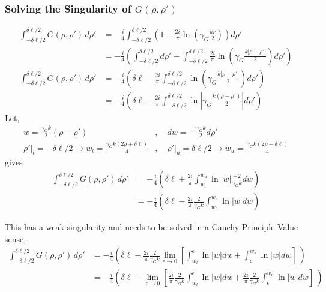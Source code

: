 \documentclass{article}
\newcommand{\0}{\varnothing}
\begin{document}
\subsubsection{Solving the Singularity of $G(\rho, \rho')$}
\begin{align*}
    \int_{-\delta\ell/2}^{\delta\ell/2} G(\rho,\rho')\, d\rho' &= -\frac{i}{4} \int_{-\delta\ell/2}^{\delta\ell/2}  \left( 1 - \frac{2i}{\pi} \ln \left( \gamma_G \frac{kr}{2}\right) \right) d\rho' \\
        &= -\frac{i}{4} \left( \int_{-\delta\ell/2}^{\delta\ell/2}  d\rho' - \int_{-\delta\ell/2}^{\delta\ell/2} \frac{2i}{\pi} \ln \left( \gamma_G \frac{k |\rho - \rho'|}{2}\right)d\rho' \right)  \\
     \int_{-\delta\ell/2}^{\delta\ell/2} G(\rho,\rho')\, d\rho' &= -\frac{i}{4} \left( \delta \ell - \frac{2i}{\pi} \int_{-\delta\ell/2}^{\delta\ell/2} \ln \left( \gamma_G \frac{k |\rho - \rho'|}{2}\right)d\rho' \right)  \\
     &= -\frac{i}{4} \left( \delta \ell - \frac{2i}{\pi} \int_{-\delta\ell/2}^{\delta\ell/2} \ln \left|\gamma_G \frac{k (\rho - \rho')}{2}\right |d\rho' \right) 
\end{align*}
Let, 
\begin{align*}
    w = \frac{\gamma_G k}{2}(\rho-\rho')&, \quad dw  = -\frac{\gamma_G k}{2} d\rho'\\ 
    \rho'|_l = - \delta \ell/2 \rightarrow w_l = \frac{\gamma_G k (2\rho+\delta \ell)}{4}&, \quad \rho'|_u =  \delta \ell/2 \rightarrow w_u = \frac{\gamma_G k (2\rho-\delta \ell)}{4}
\end{align*}
gives 
\begin{align*}
     \int_{-\delta\ell/2}^{\delta\ell/2} G(\rho,\rho')\, d\rho' &= -\frac{i}{4} \left( \delta \ell + 
     \frac{2i}{\pi} \int_{w_l}^{w_u} \ln | w | \frac{-2}{\gamma_G k} dw \right)\\
     &= -\frac{i}{4} \left( \delta \ell - \frac{2i}{\pi} \frac{2}{\gamma_G k} \int_{w_l}^{w_u} \ln | w |  dw  \right)
\end{align*}

This has a weak singularity and needs to be solved in a Cauchy Principle Value sense, 
\begin{align*}
     \int_{-\delta\ell/2}^{\delta\ell/2} G(\rho,\rho')\, d\rho' 
     &= -\frac{i}{4} \left( \delta \ell -  \frac{2i}{\pi} \frac{2}{\gamma_G k} \lim_{\epsilon \to 0} \left[ \int_{w_l}^{\epsilon} \ln | w |  dw +  \int_{\epsilon}^{w_u} \ln | w |  dw\right] \ \right)\\
     &= -\frac{i}{4} \left( \delta \ell - \lim_{\epsilon \to 0} \left[\frac{2i}{\pi} \frac{2}{\gamma_G k} \int_{w_l}^{\epsilon} \ln | w |  dw + \frac{2i}{\pi} \frac{2}{\gamma_G k} \int_{\epsilon}^{w_u} \ln | w |  dw\right] \ \right)\\
\end{align*}
\end{document}
